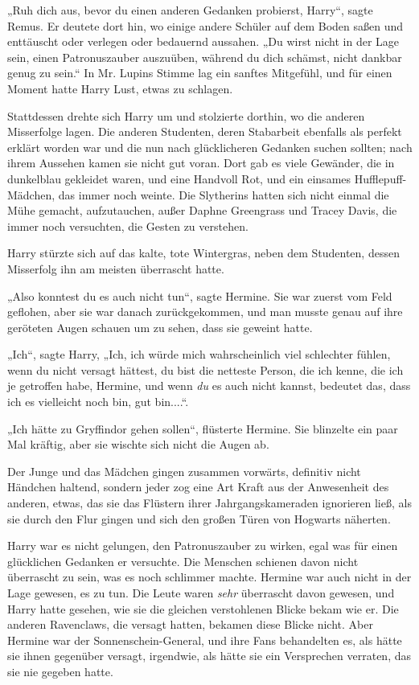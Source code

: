 {„Ruh dich aus, bevor du einen anderen Gedanken probierst, Harry“, sagte Remus. Er deutete dort hin, wo einige andere Schüler auf dem Boden saßen und enttäuscht oder verlegen oder bedauernd aussahen. „Du wirst nicht in der Lage sein, einen Patronuszauber auszuüben, während du dich schämst, nicht dankbar genug zu sein.“ In Mr. Lupins Stimme lag ein sanftes Mitgefühl, und für einen Moment hatte Harry Lust, etwas zu schlagen.

Stattdessen drehte sich Harry um und stolzierte dorthin, wo die anderen Misserfolge lagen. Die anderen Studenten, deren Stabarbeit ebenfalls als perfekt erklärt worden war und die nun nach glücklicheren Gedanken suchen sollten; nach ihrem Aussehen kamen sie nicht gut voran. Dort gab es viele Gewänder, die in dunkelblau gekleidet waren, und eine Handvoll Rot, und ein einsames Hufflepuff-Mädchen, das immer noch weinte. Die Slytherins hatten sich nicht einmal die Mühe gemacht, aufzutauchen, außer Daphne Greengrass und Tracey Davis, die immer noch versuchten, die Gesten zu verstehen.

Harry stürzte sich auf das kalte, tote Wintergras, neben dem Studenten, dessen Misserfolg ihn am meisten überrascht hatte.

„Also konntest du es auch nicht tun“, sagte Hermine. Sie war zuerst vom Feld geflohen, aber sie war danach zurückgekommen, und man musste genau auf ihre geröteten Augen schauen um zu sehen, dass sie geweint hatte.

„Ich“, sagte Harry, „Ich, ich würde mich wahrscheinlich viel schlechter fühlen, wenn du nicht versagt hättest, du bist die netteste Person, die ich kenne, die ich je getroffen habe, Hermine, und wenn \emph{du} es auch nicht kannst, bedeutet das, dass ich es vielleicht noch bin, gut bin....“.

„Ich hätte zu Gryffindor gehen sollen“, flüsterte Hermine. Sie blinzelte ein paar Mal kräftig, aber sie wischte sich nicht die Augen ab.

\hfill\break Der Junge und das Mädchen gingen zusammen vorwärts, definitiv nicht Händchen haltend, sondern jeder zog eine Art Kraft aus der Anwesenheit des anderen, etwas, das sie das Flüstern ihrer Jahrgangskameraden ignorieren ließ, als sie durch den Flur gingen und sich den großen Türen von Hogwarts näherten.

Harry war es nicht gelungen, den Patronuszauber zu wirken, egal was für einen glücklichen Gedanken er versuchte. Die Menschen schienen davon nicht überrascht zu sein, was es noch schlimmer machte. Hermine war auch nicht in der Lage gewesen, es zu tun. Die Leute waren \emph{sehr} überrascht davon gewesen, und Harry hatte gesehen, wie sie die gleichen verstohlenen Blicke bekam wie er. Die anderen Ravenclaws, die versagt hatten, bekamen diese Blicke nicht. Aber Hermine war der Sonnenschein-General, und ihre Fans behandelten es, als hätte sie ihnen gegenüber versagt, irgendwie, als hätte sie ein Versprechen verraten, das sie nie gegeben hatte.

}
